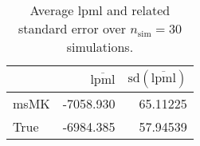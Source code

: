 \begin{table}[H]

\caption{Average lpml and related standard error over $n_{\text{sim}} = 30$ simulations.}
\centering
\begin{tabular}[t]{lrr}
\toprule
  & $\overbar{\text{lpml}}$ & $\text{sd}(\overbar{\text{lpml}})$\\
\midrule
msMK & -7058.930 & 65.11225\\
True & -6984.385 & 57.94539\\
\bottomrule
\end{tabular}
\end{table}